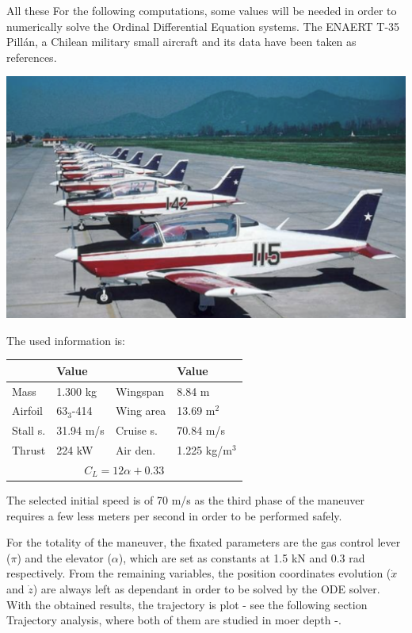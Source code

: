 All these
For the following computations, some values will be needed in order to numerically solve the Ordinal Differential Equation systems. The ENAERT T-35 Pillán, a Chilean military small aircraft and its data \cite{jane1969jane} have been taken as references.\\

\begin{center}
	\includegraphics[width=0.9\linewidth]{figures/pillan}
	\vspace{0.5cm}
	\vspace{0.25cm}
\end{center}

The used information is:

\begin{center}
\begin{tabular}{|l|l||l|l|}\hline
	 & Value &   & Value\\ \hline \hline
	Mass & 1.300 kg& Wingspan & 8.84 m\\ \hline
	Airfoil & 63$_3$-414 & Wing area & 13.69 m$^2$ \\ \hline
	Stall s. & 31.94 m/s &  Cruise s. & 70.84 m/s\\ \hline
	Thrust &224 kW & Air den. & 1.225 kg/m$^3$ \\ \hline
	\multicolumn{4}{|c|}{$C_L=12\alpha+0.33$}\\ \hline	
\end{tabular}
\end{center}

The selected initial speed is of 70 m/s as the third phase of the maneuver requires a few less meters per second in order to be performed safely.

For the totality of the maneuver, the fixated parameters are the gas control lever ($\pi$) and the elevator ($\alpha$), which are set as constants at 1.5 kN and 0.3 rad respectively. From the remaining variables, the position coordinates evolution ($\Dot{x}$ and $\Dot{z}$) are always left as dependant in order to be solved by the ODE solver. With the obtained results, the trajectory is plot - see the following section Trajectory analysis, where both of them are studied in moer depth -.

